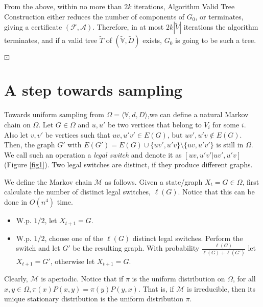 \documentclass[12pt,a4paper]{article}
\theoremstyle{definition}
\theoremstyle{plain}
\newenvironment{prf}{\noindent {\bf Proof.}}{\begin{flushright}\vspace{-2em}\footnotesize$\boxdot$\normalsize\end{flushright}\smallskip}
\begin{document}
\begin{prf}
From the above, within no more than $2k$ iterations, 
Algorithm Valid Tree Construction either reduces the 
number of components of $G_0$, or terminates, 
giving a certificate $(\mathcal F, \mathcal A)$. 
Therefore, in at most
$2k|\widetilde{V}|$ iterations the algorithm terminates, and if
a valid tree $\widetilde{T}$ of $(\mathbb{\widetilde{V}}, \widetilde D )$  exists, 
$G_0$ is going to be such a tree.
\end{prf}




\section{A step towards sampling}
\label{sec:Sampling}



Towards uniform sampling from $\Omega=\langle{\mathbb V},d,D\rangle$,we can define 
a natural Markov chain on $\Omega$.
Let $G\in \Omega$ and $u,u'$ be two vertices that belong to $V_i$ for some $i$.
Also let $v,v'$ be vertices such that $uv,u'v' \in E(G)$, but $uv', u'v \notin E(G)$.
Then, the graph $G'$ with $E(G')=E(G)\cup \{uv',u'v\} \setminus \{uv,u'v'\}$ is 
still in $\Omega$. We call such an operation a \emph{legal switch} and denote it
as $[uv,u'v'|uv',u'v]$ (Figure \ref{fig1}). Two legal switches are distinct, if they produce different
graphs.\medskip


We define the Markov chain $\mathcal M$ as follows.
Given a state/graph $X_t=G\in\Omega$, first calculate the number of distinct legal 
switches, $\ell(G)$. Notice that this can be done in $O(n^4)$ time.
\begin{itemize}
	\item W.p. $1/2$, let $X_{t+1}=G$.
	\item W.p. $1/2$, choose one of the $\ell(G)$ distinct legal switches. Perform
	the switch and let $G'$ be the resulting graph. With probability
	$\frac{\ell(G)}{\ell(G)+\ell(G')}$ let $X_{t+1}=G'$, otherwise let $X_{t+1}=G$.
\end{itemize}

Clearly, $\mathcal M$ is aperiodic. Notice that if $\pi$ is the uniform distribution on $\Omega$,
for all $x, y \in \Omega, \pi(x)P(x, y) = \pi(y)P(y, x)$. That is, if $\mathcal M$ is
irreducible, then its unique stationary distribution is the uniform distribution $\pi$.
\end{document}
